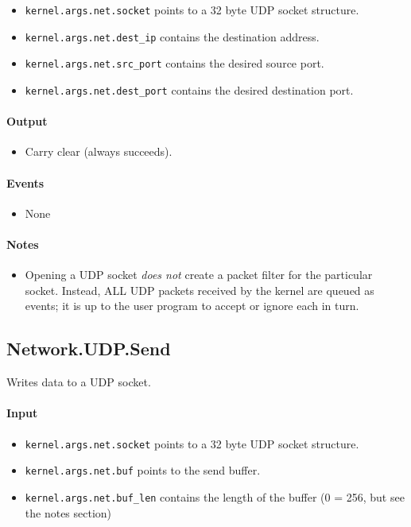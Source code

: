 \begin{itemize}
\item \verb+kernel.args.net.socket+ points to a 32 byte UDP socket structure.
\item \verb+kernel.args.net.dest_ip+ contains the destination address.
\item \verb+kernel.args.net.src_port+ contains the desired source port.
\item \verb+kernel.args.net.dest_port+ contains the desired destination port.
\end{itemize}

\paragraph{Output}

\begin{itemize}
\item Carry clear (always succeeds).
\end{itemize}

\paragraph{Events}

\begin{itemize}
\item None
\end{itemize}

\paragraph{Notes}

\begin{itemize}
\item Opening a UDP socket {\em does not} create a packet filter for the particular socket.  Instead, ALL UDP packets received by the kernel are queued as events; it is up to the user program to accept or ignore each in turn.
\end{itemize}

\subsection*{Network.UDP.Send}
Writes data to a UDP socket.

\paragraph{Input}

\begin{itemize}
\item \verb+kernel.args.net.socket+ points to a 32 byte UDP socket structure.
\item \verb+kernel.args.net.buf+ points to the send buffer.
\item \verb+kernel.args.net.buf_len+ contains the length of the buffer (0 = 256, but see the notes section)
\end{itemize}

